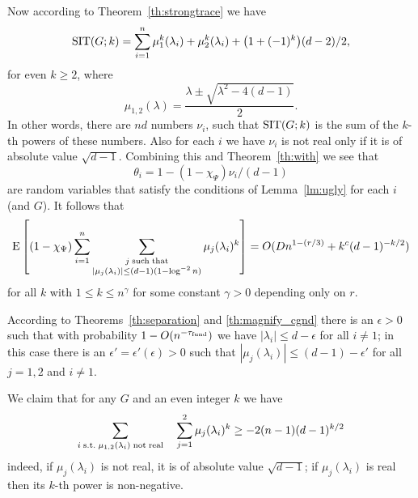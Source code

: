 \documentclass[12pt]{article}
\newcommand{\fund}{{\rm fund}}
\newcommand{\taufund}{{\tau_\fund}}
\newcommand{\tset}{{\Psi}}
\newcommand{\sit}{{\rm SIT}}
\newcommand{\E}[1]{\mbox{E}\left[#1\right] }
\begin{document}
Now according to Theorem~\ref{th:strongtrace} we have
$$
\sit(G;k) = \sum_{i=1}^n \mu_1^k(\lambda_i)+\mu_2^k(\lambda_i)+
\bigl( 1+(-1)^k \bigr)(d-2)/2,
$$
for even $k\ge 2$, where
$$
\mu_{1,2}(\lambda) = \frac{\lambda\pm\sqrt{\lambda^2-4(d-1)}}{2}.
$$
In other words, there are $nd$ numbers $\nu_i$,
such that $\sit(G;k)$ is the sum of
the $k$-th powers of these numbers.  
Also for each $i$ we have $\nu_i$ is not real only if
it is of absolute value $\sqrt{d-1}$.
Combining this and Theorem~\ref{th:with} we see that
$$
\theta_i=1-(1-\chi_\tset)\nu_i/(d-1)
$$
are random variables that
satisfy
the conditions of Lemma~\ref{lm:ugly} for each $i$ (and $G$).
It follows that
\begin{equation}\label{eq:verybig}
\E{ (1-\chi_\tset)\sum_{i=1}^n
\sum_{\substack{j\;\rm such\;that\cr |\mu_j(\lambda_i)|\le (d-1)(1-\log^{-2}n)}}
\mu_j(\lambda_i)^k } 
= O(Dn^{1-(r/3)}+k^c(d-1)^{-k/2})
\end{equation}
for all $k$ with $1\le k\le n^\gamma$ for some constant $\gamma>0$
depending only on $r$.

According to Theorems~\ref{th:separation} and \ref{th:magnify_cgnd}
there is an $\epsilon>0$ such that with probability
$1-O(n^{-\taufund})$ we have $|\lambda_i|\le d-\epsilon$ for all
$i\ne 1$; in this case there is an $\epsilon'=\epsilon'(\epsilon)>0$
such that $|\mu_j(\lambda_i)|\le (d-1)-\epsilon'$
for all $j=1,2$ and $i\ne 1$.

We claim that for any $G$ and an even integer $k$ we have
$$
\sum_{i\;{\rm s.t.}\;\mu_{1,2}(\lambda_i)\;{\rm not\;real}}\quad \sum_{j=1}^2 
\mu_j(\lambda_i)^k \ge  - 2(n-1)(d-1)^{k/2}
$$
indeed, if $\mu_j(\lambda_i)$ is not real, it
is of absolute value $\sqrt{d-1}$; if $\mu_j(\lambda_i)$ is real then
its $k$-th power is non-negative.
\end{document}
